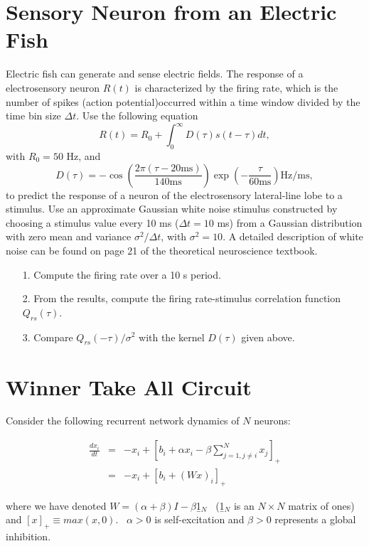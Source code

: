 \documentclass{article}
\begin{document}
\section*{Sensory Neuron from an Electric Fish}
Electric fish can generate and sense electric fields. The response of a electrosensory neuron $R(t)$ is characterized by the firing rate, which is the number of spikes (action potential)occurred within a time window divided by the time bin size $\Delta t$.  Use the following equation 
\begin{equation}
R(t) = R_0 + \int_0^\infty D(\tau) s(t-\tau) dt,
\end{equation}
with $R_0 = 50$ Hz, and 
\begin{equation}
D(\tau) = -\cos (\frac{2\pi (\tau - 20 \mathrm{ ms})}{140 \mathrm{ ms}} )\exp ( - \frac{\tau}{60 \mathrm{ ms}} ) \mathrm{ Hz/ms},
\end{equation}
to predict the response of a neuron of the electrosensory lateral-line lobe to a stimulus. Use an approximate Gaussian white noise stimulus constructed by choosing a stimulus value every 10 ms ($\Delta t = 10$ ms) from a Gaussian distribution with zero mean and variance $\sigma^2 /\Delta t$, with $\sigma^2 =10$. A detailed description of white noise can be found on page 21 of the theoretical neuroscience textbook. 
\begin{enumerate}
\item[1.]Compute the firing rate over a 10 s period. 
\item[2.]From the results, compute the firing rate-stimulus correlation function $Q_{rs}(\tau)$. 
\item[3.]Compare $Q_{rs}(-\tau)/\sigma^2$ with the kernel $D(\tau)$ given above.
\end{enumerate}

\section*{Winner Take All Circuit}

Consider the following recurrent network dynamics of $N$ neurons:

\begin{eqnarray}
\frac{dx_{i}}{dt} &=&-x_{i}+\left[ b_{i}+\alpha x_{i}-\beta \sum_{j=1,j\neq
i}^{N}x_{j}\right] _{+} \\
&=&-x_{i}+\left[ b_{i}+(Wx)_{i}\right] _{+}  \label{eq:wta}
\end{eqnarray}

where we have denoted $W=(\alpha +\beta )I-\beta $\b{1}$_{N}$ \ (\b{1}$_{N}$
is an $N\times N$ matrix of ones) and  $\left[ x\right] _{+}\equiv max(x,0)$. \ $%
\alpha >0$ is self-excitation and $\beta >0$ represents a global
inhibition.
\end{document}

